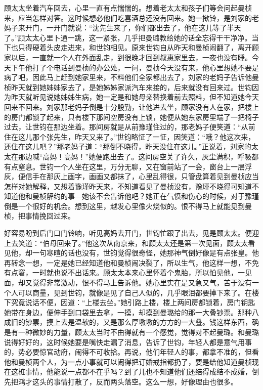 \par 顾太太坐着汽车回去，心里一直有点惴惴的。想着老太太和孩子们等会问起曼桢来，应当怎样对答。这时候想必他们吃喜酒总还没有回来。她一揿铃，是刘家的老妈子来开门，一开门就说：“沈先生来了，你们都出去了，他在这儿等了半天了。”顾太太心里卜通一跳，这一紧张，几乎把曼璐教给她的话全忘得干干净净。当下也只得硬着头皮走进来，和世钧相见。原来世钧自从昨天和曼桢闹翻了，离开顾家以后，一直就一个人在外面乱走，到很晚才回到叔惠家里去，一夜也没有睡。今天下午他打了个电话到曼桢的办公处，一问，曼桢今天没有来，他心里想她不要是病了吧，因此马上赶到她家里来，不料他们全家都出去了，刘家的老妈子告诉他曼桢昨天就到她姊姊家去了，是她姊姊家派汽车来接的，后来就没有回来过。世钧因为昨天就听见说她姊姊生病，她一定是和她母亲替换着前去照料，但不知道她今天回来不回来。刘家那老妈子倒是十分殷勤，让他进去坐，顾家没有人在家，把楼上的房门都锁了起来，只有楼下那间空房没有上锁，她便从她东家房里端了一把椅子过去，让世钧在那边坐着。那间房就是从前豫瑾住过的，那老妈子便笑道：“从前住在这儿那个张先生，昨天又来了。”世钧略怔了一怔，因笑道：“哦？他这次来，还住在这儿吧？”那老妈子道：“那倒不晓得，昨天没住在这儿。”正说着，刘家的太太在那边喊“高妈！高妈！”她便跑出去了。这间房空关了许久，灰尘满积，呼吸都有点窒息。世钧一个人坐在这里，万分无聊，又在窗前站了一会，窗台上一层浮灰，便信手在那灰上画字，画画又都抹了，心里乱得很，只管盘算着见到曼桢应当怎样对她解释，又想着豫瑾昨天来，不知道看见了曼桢没有，豫瑾不晓得可知道不知道他和曼桢解约的事—她该不会告诉他吧？她正在气愤和伤心的时候，对于豫瑾倒是一个很好的机会。想到这里，越发心里像火烧似的。恨不得马上就能见到曼桢，把事情挽回过来。
\par 好容易盼到后门口门铃响，听见高妈去开门，世钧忙跟了出去，见是顾太太。便迎上去笑道：“伯母回来了。”他这次从南京来，和顾太太还是第一次见面，顾太太看见他，却一句寒暄的话也没有，世钧觉得很奇怪，她那神气倒好像是有点张皇。他再转念一想，一定是她已经知道他和曼桢闹决裂了，所以生气，他这样一想，不免有点窘，一时就也说不出话来。顾太太本来心里怀着个鬼胎，所以怕见他，一见面，却又觉得非常激动，恨不得马上告诉他。她心里实在是又急又气，苦于没有一个人可以商量，见到世钧，就像是见了自己人似的，几乎眼泪都要掉下来了。在楼下究竟说话不便，因道：“上楼去坐。”她引路上楼，楼上两间房都锁着，房门钥匙她带在身边，便伸手到口袋里去拿，一摸，却摸到曼璐给的那一大叠钞票。那种八成旧的钞票，摸上去是温软的，又是那么厚墩墩的方方的一大叠。钱这样东西，确是有一种微妙的力量，顾太太当时不由得就有一个感觉，觉得对不起曼璐。和曼璐说得好好的，这时候她要是嘴快走漏了消息，告诉了世钧，年轻人都是意气用事的，势必要惊官动府，闹得不可收拾。再说，他们年轻人的事，都拿不准的，但看他和曼桢两个人，为一点小事就可以闹得把订婚戒指都扔了，要是给他知道曼桢现在这桩事情，他能说一点都不在乎吗？到了儿也不知道他们还结得成结不成婚，倒先把鸿才这头的事情打散了，反而两头落空。这么一想，好像理由也很多。
